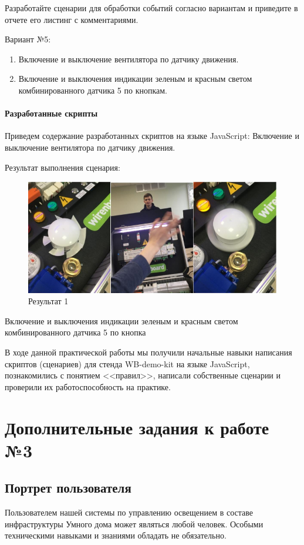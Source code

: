 \documentclass[a4paper,14pt]{extarticle}
\begin{document}
Разработайте сценарии для обработки событий согласно вариантам и приведите в отчете его листинг с комментариями.

Вариант №5:
\begin{enumerate}
	\item Включение и выключение вентилятора по датчику движения.
	
	\item Включение и выключения индикации зеленым и красным светом комбинированного датчика 5 по кнопкам.
\end{enumerate}
\paragraph{Разработанные скрипты} Приведем содержание разработанных скриптов на языке JavaScript:
\setcounter{script}{0}
\script Включение и выключение вентилятора по датчику движения.

\newpage
Результат выполнения сценария:
\begin{figure}[htbp]
	\centering
	\includegraphics[width=0.7\linewidth]{images/script1-result}
	\caption{Результат 1}
	\label{fig:script1-result}
\end{figure}


\script Включение и выключения индикации зеленым и красным светом комбинированного датчика 5 по кнопка

В ходе данной практической работы мы получили начальные навыки написания скриптов (сценариев) для стенда WB-demo-kit  на языке JavaScript, познакомились с понятием <<правил>>, написали собственные сценарии и проверили их работоспособность на практике. 

\newpage

\section{Дополнительные задания к работе №3}
\subsection{Портрет пользователя}
Пользователем нашей системы по управлению освещением в составе инфраструктуры Умного дома может являться любой человек. Особыми техническими навыками и знаниями обладать не обязательно.
\end{document}
